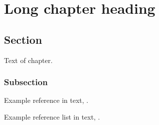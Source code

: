 
\chapter[Short chapter heading]{Long chapter heading} 
\label{ch:chapter1_label}

\section[Sec]{Section}
\label{sec:section1_label}

Text of chapter.  

\subsection[Subsec]{Subsection}
\label{sec:subsec1_label}

Example reference in text, \cite{ref1}.

Example reference list in text, \cite{ref1,ref2}.




